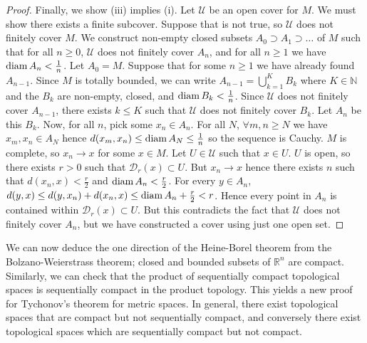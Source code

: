 \begin{proof}
	Finally, we show (iii) implies (i).
	Let \( \mathcal U \) be an open cover for \( M \).
	We must show there exists a finite subcover.
	Suppose that is not true, so \( \mathcal U \) does not finitely cover \( M \).
	We construct non-empty closed subsets \( A_0 \supset A_1 \supset \dots \) of \( M \) such that for all \( n \geq 0 \), \( \mathcal U \) does not finitely cover \( A_n \), and for all \( n \geq 1 \) we have \( \operatorname{diam} A_n < \frac{1}{n} \).
	Let \( A_0 = M \).
	Suppose that for some \( n \geq 1 \) we have already found \( A_{n-1} \).
	Since \( M \) is totally bounded, we can write \( A_{n-1} = \bigcup_{k=1}^K B_k \) where \( K \in \mathbb N \) and the \( B_k \) are non-empty, closed, and \( \operatorname{diam} B_k < \frac{1}{n} \).
	Since \( \mathcal U \) does not finitely cover \( A_{n-1} \), there exists \( k \leq K \) such that \( \mathcal U \) does not finitely cover \( B_k \).
	Let \( A_n \) be this \( B_k \).
	Now, for all \( n \), pick some \( x_n \in A_n \).
	For all \( N \), \( \forall m,n \geq N \) we have \( x_m, x_n \in A_N \) hence \( d(x_m, x_n) \leq \operatorname{diam} A_N \leq \frac{1}{n} \) so the sequence is Cauchy.
	\( M \) is complete, so \( x_n \to x \) for some \( x \in M \).
	Let \( U \in \mathcal U \) such that \( x \in U \).
	\( U \) is open, so there exists \( r > 0 \) such that \( \mathcal D_r(x) \subset U \).
	But \( x_n \to x \) hence there exists \( n \) such that \( d(x_n, x) < \frac{r}{2} \) and \( \operatorname{diam} A_n < \frac{r}{2} \).
	For every \( y \in A_n \), \( d(y,x) \leq d(y,x_n) + d(x_n, x) \leq \operatorname{diam} A_n + \frac{r}{2} < r \).
	Hence every point in \( A_n \) is contained within \( \mathcal D_r(x) \subset U \).
	But this contradicts the fact that \( \mathcal U \) does not finitely cover \( A_n \), but we have constructed a cover using just one open set.
\end{proof}
\begin{remark}
	We can now deduce the one direction of the Heine-Borel theorem from the Bolzano-Weierstrass theorem; closed and bounded subsets of \( \mathbb R^n \) are compact.
	Similarly, we can check that the product of sequentially compact topological spaces is sequentially compact in the product topology.
	This yields a new proof for Tychonov's theorem for metric spaces.
	In general, there exist topological spaces that are compact but not sequentially compact, and conversely there exist topological spaces which are sequentially compact but not compact.
\end{remark}
